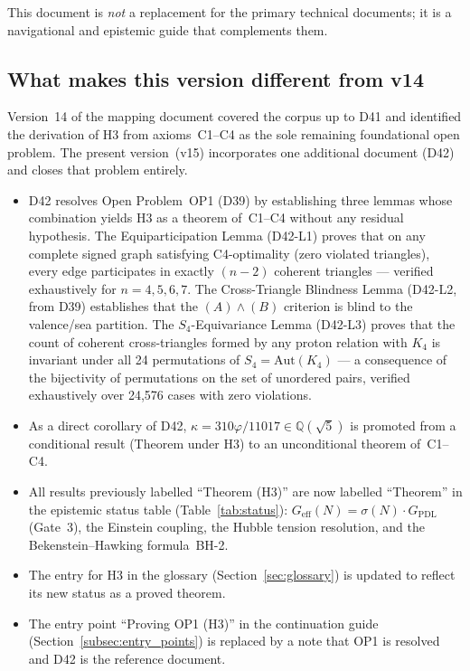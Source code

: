 \documentclass[11pt,a4paper]{article}
\theoremstyle{plain}
\theoremstyle{definition}
\theoremstyle{remark}
\newcommand{\Kfour}{K_4}
\newcommand{\Geff}{G_{\mathrm{eff}}}
\newcommand{\GPDL}{G_{\mathrm{PDL}}}
\newcommand{\sigmaN}{\sigma(N)}
\begin{document}
This document is \emph{not} a replacement for the primary technical documents; it is a navigational and epistemic guide that complements them.

\subsection{What makes this version different from v14}
\label{subsec:diff_v14}

Version~14 of the mapping document covered the corpus up to D41 and identified the derivation of H3 from axioms~C1--C4 as the sole remaining foundational open problem. The present version~(v15) incorporates one additional document (D42) and closes that problem entirely.

\begin{itemize}
\item D42 resolves Open Problem~OP1 (D39) by establishing three lemmas whose combination yields H3 as a theorem of~C1--C4 without any residual hypothesis. The Equiparticipation Lemma (D42-L1) proves that on any complete signed graph satisfying C4-optimality (zero violated triangles), every edge participates in exactly $(n-2)$ coherent triangles --- verified exhaustively for $n=4,5,6,7$. The Cross-Triangle Blindness Lemma (D42-L2, from D39) establishes that the $(A)\wedge(B)$ criterion is blind to the valence/sea partition. The $S_4$-Equivariance Lemma (D42-L3) proves that the count of coherent cross-triangles formed by any proton relation with $\Kfour$ is invariant under all 24 permutations of $S_4 = \mathrm{Aut}(\Kfour)$ --- a consequence of the bijectivity of permutations on the set of unordered pairs, verified exhaustively over 24,576 cases with zero violations.
\item As a direct corollary of D42, $\kappa = 310\varphi/11017 \in \mathbb{Q}(\sqrt{5})$ is promoted from a conditional result (Theorem under H3) to an unconditional theorem of~C1--C4.
\item All results previously labelled ``Theorem (H3)'' are now labelled ``Theorem'' in the epistemic status table (Table~\ref{tab:status}): $\Geff(N) = \sigmaN\cdot\GPDL$ (Gate~3), the Einstein coupling, the Hubble tension resolution, and the Bekenstein--Hawking formula~BH-2.
\item The entry for H3 in the glossary (Section~\ref{sec:glossary}) is updated to reflect its new status as a proved theorem.
\item The entry point ``Proving OP1 (H3)'' in the continuation guide (Section~\ref{subsec:entry_points}) is replaced by a note that OP1 is resolved and D42 is the reference document.
\end{itemize}
\end{document}
